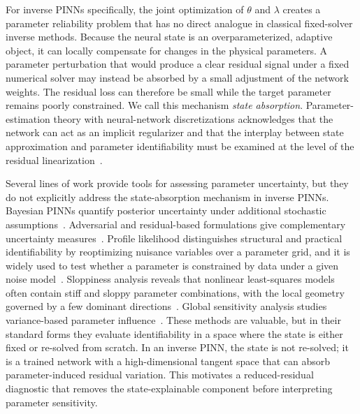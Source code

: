 \documentclass[preprint,12pt]{elsarticle}
\begin{document}
For inverse PINNs specifically, the joint optimization of $\theta$ and $\lambda$ creates a parameter reliability problem that has no direct analogue in classical fixed-solver inverse methods.  Because the neural state is an overparameterized, adaptive object, it can locally compensate for changes in the physical parameters.  A parameter perturbation that would produce a clear residual signal under a fixed numerical solver may instead be absorbed by a small adjustment of the network weights.  The residual loss can therefore be small while the target parameter remains poorly constrained.  We call this mechanism \emph{state absorption}.  Parameter-estimation theory with neural-network discretizations acknowledges that the network can act as an implicit regularizer and that the interplay between state approximation and parameter identifiability must be examined at the level of the residual linearization~\cite{kaltenbacher2022discretization,aarset2022learning}.

Several lines of work provide tools for assessing parameter uncertainty, but they do not explicitly address the state-absorption mechanism in inverse PINNs.  Bayesian PINNs quantify posterior uncertainty under additional stochastic assumptions~\cite{yang2021bpinns,zhang2019uncertainty}.  Adversarial and residual-based formulations give complementary uncertainty measures~\cite{yang2019adversarial}.  Profile likelihood distinguishes structural and practical identifiability by reoptimizing nuisance variables over a parameter grid, and it is widely used to test whether a parameter is constrained by data under a given noise model~\cite{raue2009structural}.  Sloppiness analysis reveals that nonlinear least-squares models often contain stiff and sloppy parameter combinations, with the local geometry governed by a few dominant directions~\cite{gutenkunst2007universally,transtrum2011geometry}.  Global sensitivity analysis studies variance-based parameter influence~\cite{saltelli2008global}.  These methods are valuable, but in their standard forms they evaluate identifiability in a space where the state is either fixed or re-solved from scratch.  In an inverse PINN, the state is not re-solved; it is a trained network with a high-dimensional tangent space that can absorb parameter-induced residual variation.  This motivates a reduced-residual diagnostic that removes the state-explainable component before interpreting parameter sensitivity.
\end{document}
